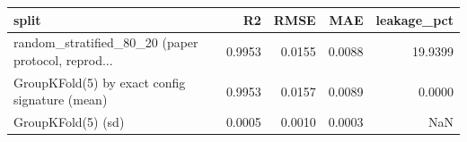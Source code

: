 \begin{tabular}{lrrrr}
\toprule
                                             split &     R2 &   RMSE &    MAE &  leakage\_pct \\
\midrule
random\_stratified\_80\_20 (paper protocol, reprod... & 0.9953 & 0.0155 & 0.0088 &      19.9399 \\
    GroupKFold(5) by exact config signature (mean) & 0.9953 & 0.0157 & 0.0089 &       0.0000 \\
                                GroupKFold(5) (sd) & 0.0005 & 0.0010 & 0.0003 &          NaN \\
\bottomrule
\end{tabular}
